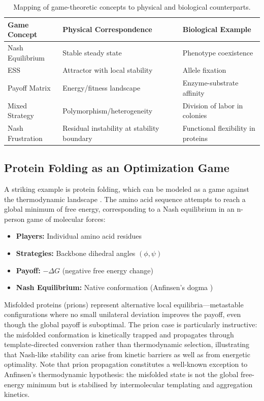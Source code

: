 \documentclass[12pt,a4paper]{article}
\theoremstyle{remark}
\begin{document}
\begin{table}[htbp]
\centering
\caption{Mapping of game-theoretic concepts to physical and biological counterparts.}
\label{tab:game-biology-mapping}
\begin{tabular}{lll}
\toprule
\textbf{Game Concept} & \textbf{Physical Correspondence} & \textbf{Biological Example} \\
\midrule
Nash Equilibrium & Stable steady state & Phenotype coexistence \\
ESS & Attractor with local stability & Allele fixation \\
Payoff Matrix & Energy/fitness landscape & Enzyme-substrate affinity \\
Mixed Strategy & Polymorphism/heterogeneity & Division of labor in colonies \\
Nash Frustration & Residual instability at stability boundary & Functional flexibility in proteins \\
\bottomrule
\end{tabular}
\end{table}

\subsection{Protein Folding as an Optimization Game}

A striking example is protein folding, which can be modeled as a game against the thermodynamic landscape \citep{EnzymeFolding}. The amino acid sequence attempts to reach a global minimum of free energy, corresponding to a Nash equilibrium in an n-person game of molecular forces:

\begin{itemize}
    \item \textbf{Players:} Individual amino acid residues
    \item \textbf{Strategies:} Backbone dihedral angles $(\phi, \psi)$
    \item \textbf{Payoff:} $-\Delta G$ (negative free energy change)
    \item \textbf{Nash Equilibrium:} Native conformation (Anfinsen's dogma \citep{Anfinsen1973})
\end{itemize}

Misfolded proteins (prions) represent alternative local equilibria---metastable configurations where no small unilateral deviation improves the payoff, even though the global payoff is suboptimal. The prion case is particularly instructive: the misfolded conformation is kinetically trapped and propagates through template-directed conversion rather than thermodynamic selection, illustrating that Nash-like stability can arise from kinetic barriers as well as from energetic optimality. Note that prion propagation constitutes a well-known exception to Anfinsen's thermodynamic hypothesis: the misfolded state is not the global free-energy minimum but is stabilised by intermolecular templating and aggregation kinetics.
\end{document}
